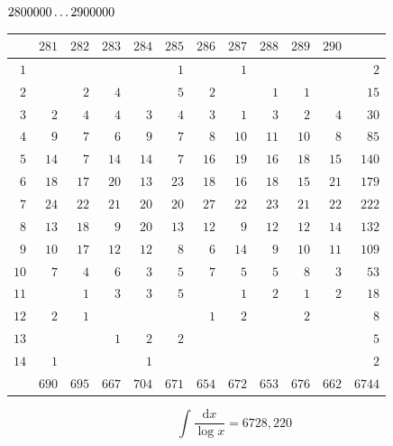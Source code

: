 \clearpage
\noindent\begin{minipage}{\linewidth}\centering
{}
\(2800000\mathinner{.\,.\,.}2900000\)\par\smallskip
\begingroup\fontsize{10.5}{11.5}\selectfont\setlength{\tabcolsep}{3.5pt}\renewcommand{\arraystretch}{1}
\begin{tabular}{r|rrrrrrrrrr|r}\hline
 & $281$ & $282$ & $283$ & $284$ & $285$ & $286$ & $287$ & $288$ & $289$ & $290$ &  \\ \hline
$1$ &  &  &  &  & $1$ &  & $1$ &  &  &  & $2$ \\
$2$ &  & $2$ & $4$ &  & $5$ & $2$ &  & $1$ & $1$ &  & $15$ \\
$3$ & $2$ & $4$ & $4$ & $3$ & $4$ & $3$ & $1$ & $3$ & $2$ & $4$ & $30$ \\
$4$ & $9$ & $7$ & $6$ & $9$ & $7$ & $8$ & $10$ & $11$ & $10$ & $8$ & $85$ \\
$5$ & $14$ & $7$ & $14$ & $14$ & $7$ & $16$ & $19$ & $16$ & $18$ & $15$ & $140$ \\
$6$ & $18$ & $17$ & $20$ & $13$ & $23$ & $18$ & $16$ & $18$ & $15$ & $21$ & $179$ \\
$7$ & $24$ & $22$ & $21$ & $20$ & $20$ & $27$ & $22$ & $23$ & $21$ & $22$ & $222$ \\
$8$ & $13$ & $18$ & $9$ & $20$ & $13$ & $12$ & $9$ & $12$ & $12$ & $14$ & $132$ \\
$9$ & $10$ & $17$ & $12$ & $12$ & $8$ & $6$ & $14$ & $9$ & $10$ & $11$ & $109$ \\
$10$ & $7$ & $4$ & $6$ & $3$ & $5$ & $7$ & $5$ & $5$ & $8$ & $3$ & $53$ \\
$11$ &  & $1$ & $3$ & $3$ & $5$ &  & $1$ & $2$ & $1$ & $2$ & $18$ \\
$12$ & $2$ & $1$ &  &  &  & $1$ & $2$ &  & $2$ &  & $8$ \\
$13$ &  &  & $1$ & $2$ & $2$ &  &  &  &  &  & $5$ \\
$14$ & $1$ &  &  & $1$ &  &  &  &  &  &  & $2$ \\
\hline
 & $690$ & $695$ & $667$ & $704$ & $671$ & $654$ & $672$ & $653$ & $676$ & $662$ & $6744$ \\ \hline
\end{tabular}\par\endgroup
\setlength{\abovedisplayskip}{6pt}\setlength{\belowdisplayskip}{4pt}
\[\int\frac{\mathrm{d}x}{\log x}=6728{,}220\]
\end{minipage}\par

